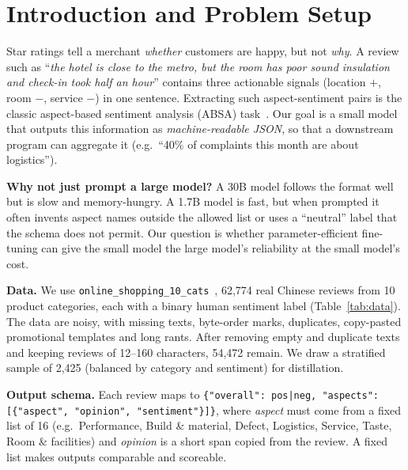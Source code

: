 \documentclass[journal]{IEEEtran}
\begin{document}
\section{Introduction and Problem Setup}
\label{sec:intro}

Star ratings tell a merchant \emph{whether} customers are happy, but not \emph{why}. A review such as
``\textit{the hotel is close to the metro, but the room has poor sound insulation and check-in took half an hour}''
contains three actionable signals (location $+$, room $-$, service $-$) in one sentence. Extracting such
aspect-sentiment pairs is the classic aspect-based sentiment analysis (ABSA) task~\cite{pontiki2014semeval}.
Our goal is a small model that outputs this information as \emph{machine-readable JSON}, so that a downstream
program can aggregate it (e.g.\ ``40\% of complaints this month are about logistics'').

\textbf{Why not just prompt a large model?} A 30B model follows the format well but is slow and memory-hungry. A 1.7B
model is fast, but when prompted it often invents aspect names outside the allowed list or uses a ``neutral'' label that
the schema does not permit. Our question is whether parameter-efficient fine-tuning can give the small model the
large model's reliability at the small model's cost.

\textbf{Data.} We use \texttt{online\_shopping\_10\_cats}~\cite{chinesenlpcorpus}, 62{,}774 real Chinese reviews from 10
product categories, each with a binary human sentiment label (Table~\ref{tab:data}). The data are noisy, with
missing texts, byte-order marks, duplicates, copy-pasted promotional templates and long rants. After removing empty and
duplicate texts and keeping reviews of 12--160 characters, 54{,}472 remain. We draw a stratified sample of 2{,}425
(balanced by category and sentiment) for distillation.

\textbf{Output schema.} Each review maps to
\texttt{\{"overall": pos|neg, "aspects": [\{"aspect", "opinion", "sentiment"\}]\}}, where \emph{aspect} must come from a
fixed list of 16 (e.g.\ Performance, Build \& material, Defect, Logistics, Service, Taste, Room \& facilities) and
\emph{opinion} is a short span copied from the review. A fixed list makes outputs comparable and scoreable.
\end{document}
